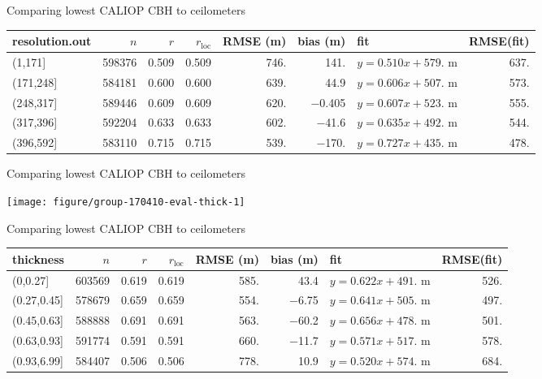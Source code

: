\documentclass[10pt,notes=all,aspectratio=1610]{beamer}\usepackage[]{graphicx}\usepackage[]{color}
\newenvironment{knitrout}{}{} %
\begin{document}
\begin{frame}[fragile]{Comparing lowest CALIOP CBH to ceilometers}
  \begin{adjustbox}{max width=\textwidth}
\begin{tabular}{lrrrrrlr}
  \hline
\hline
resolution.out & $n$ & $r$ & $r_\text{loc}$ & RMSE (m) & bias (m) & fit & RMSE(fit) \\ 
  \hline
(1,171] & 598376 & 0.509 & 0.509 & 746. & 141. & $y = 0.510 x + 579.$ m & 637. \\ 
  (171,248] & 584181 & 0.600 & 0.600 & 639. & 44.9 & $y = 0.606 x + 507.$ m & 573. \\ 
  (248,317] & 589446 & 0.609 & 0.609 & 620. & $-$0.405 & $y = 0.607 x + 523.$ m & 555. \\ 
  (317,396] & 592204 & 0.633 & 0.633 & 602. & $-$41.6 & $y = 0.635 x + 492.$ m & 544. \\ 
  (396,592] & 583110 & 0.715 & 0.715 & 539. & $-$170. & $y = 0.727 x + 435.$ m & 478. \\ 
   \hline
\hline
\end{tabular}

  \end{adjustbox}
\end{frame}
\begin{frame}[fragile]{Comparing lowest CALIOP CBH to ceilometers}
\begin{knitrout}
\color{fgcolor}

{\centering \texttt{[image: figure/group-170410-eval-thick-1]} 

}



\end{knitrout}
\end{frame}
\begin{frame}[fragile]{Comparing lowest CALIOP CBH to ceilometers}
  \begin{adjustbox}{max width=\textwidth}
\begin{tabular}{lrrrrrlr}
  \hline
\hline
thickness & $n$ & $r$ & $r_\text{loc}$ & RMSE (m) & bias (m) & fit & RMSE(fit) \\ 
  \hline
(0,0.27] & 603569 & 0.619 & 0.619 & 585. & 43.4 & $y = 0.622 x + 491.$ m & 526. \\ 
  (0.27,0.45] & 578679 & 0.659 & 0.659 & 554. & $-$6.75 & $y = 0.641 x + 505.$ m & 497. \\ 
  (0.45,0.63] & 588888 & 0.691 & 0.691 & 563. & $-$60.2 & $y = 0.656 x + 478.$ m & 501. \\ 
  (0.63,0.93] & 591774 & 0.591 & 0.591 & 660. & $-$11.7 & $y = 0.571 x + 517.$ m & 578. \\ 
  (0.93,6.99] & 584407 & 0.506 & 0.506 & 778. & 10.9 & $y = 0.520 x + 574.$ m & 684. \\ 
   \hline
\hline
\end{tabular}

  \end{adjustbox}
\end{frame}
\end{document}
